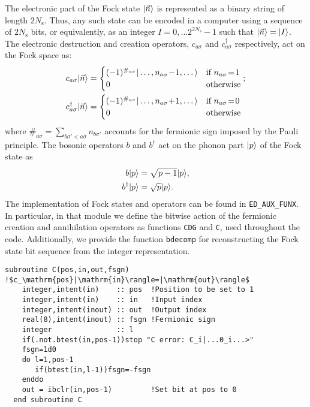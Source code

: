 \documentclass[edipack_sp.tex]{subfiles}
\begin{document}
The electronic part of the Fock state $|\vec{n}\rangle$ is represented
as a binary string of length $2N_\mathrm{s}$. Thus, any such state can be encoded
in a computer using a sequence of $2N_\mathrm{s}$ bits, or equivalently, as an integer $I=0,\dots 2^{2N_\mathrm{s}}-1$ such that $|\vec{n}\rangle=|I\rangle$.  
The electronic destruction and creation operators, $c_{a\sigma}$ and $c^\dagger_{a\sigma}$ 
respectively, act on the Fock space as:
\begin{align*}
  c_{a\sigma}\ket{\vec{n}} &=
    \begin{cases}
      (-1)^{\#_{a\sigma}}\ket{\dots,n_{a\sigma}\!-\!1,\dots}
      &\text{if $n_{a\sigma}\!=\! 1$}\\
      0 &\text{otherwise}
    \end{cases};\\
    c^\dagger_{a\sigma}\ket{\vec{n}} &=
     \begin{cases}
      (-1)^{\#_{a\sigma}}\ket{\dots,n_{a\sigma}\!+\!1,\dots}
      & \text{if $n_{a\sigma}\!=\! 0$}\\
      0 & \text{otherwise}
    \end{cases}    
\end{align*}
where $\#_{a\sigma}=\sum_{b\sigma'<a\sigma} n_{b\sigma'}$ accounts for the fermionic sign imposed by the Pauli principle.
The bosonic operators $b$ and $b^\dagger$ act on the phonon part $|p\rangle$ of the Fock state as
\begin{align*}
  b|p\rangle &= \sqrt{p-1}|p\rangle, \\
  b^\dagger|p\rangle &= \sqrt{p}|p\rangle. \\
\end{align*}
The implementation of Fock states and operators can be found in 
{\tt ED\_AUX\_FUNX}. In particular, in that module we define the bitwise action 
of the fermionic creation and annihilation operators as functions 
{\tt CDG} and {\tt C}, used throughout the code. Additionally, 
we provide the function {\tt bdecomp} for reconstructing the Fock  state bit sequence from the integer representation. 


\begin{lstlisting}[style=fstyle,numbers=none]
  subroutine C(pos,in,out,fsgn) !$c_\mathrm{pos}|\mathrm{in}\rangle=|\mathrm{out}\rangle$
    integer,intent(in)    :: pos  !Position to be set to 1
    integer,intent(in)    :: in   !Input index
    integer,intent(inout) :: out  !Output index
    real(8),intent(inout) :: fsgn !Fermionic sign   
    integer               :: l
    if(.not.btest(in,pos-1))stop "C error: C_i|...0_i...>"
    fsgn=1d0
    do l=1,pos-1
       if(btest(in,l-1))fsgn=-fsgn
    enddo
    out = ibclr(in,pos-1)         !Set bit at pos to 0
  end subroutine C
\end{lstlisting}
\end{document}

